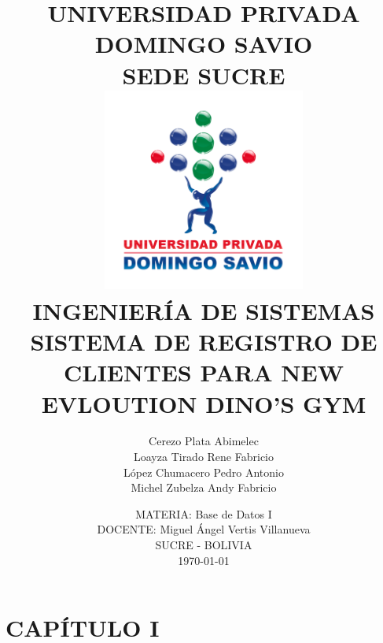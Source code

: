 \documentclass[12pt, letterpaper]{article}
\begin{document}
\title{
    \vspace*{-2cm}
    UNIVERSIDAD PRIVADA DOMINGO SAVIO\\
    SEDE SUCRE\\
    \vspace{0.5cm}
    \includegraphics[width=0.5\textwidth]{logo_upds.png}\\
    \vspace{0.5cm} 
    INGENIERÍA DE SISTEMAS\\
    \vspace{1cm}
    SISTEMA DE REGISTRO DE CLIENTES PARA \textbf{NEW EVLOUTION DINO'S GYM}
}
\author{
    Cerezo Plata Abimelec \\
    Loayza Tirado Rene Fabricio \\
    López Chumacero Pedro Antonio \\
    Michel Zubelza Andy Fabricio
}
\date{
    MATERIA: Base de Datos I \\
    DOCENTE: Miguel Ángel Vertis Villanueva \\
    \vspace{1cm}
    SUCRE - BOLIVIA \\
    \today
}

\maketitle
\thispagestyle{empty}
\newpage
\clearpage

\tableofcontents
\thispagestyle{empty}
\newpage
\clearpage


\listoffigures
\thispagestyle{empty}
\newpage
\clearpage

\setcounter{page}{1}
\section*{CAPÍTULO I}
\setcounter{section}{1}
\end{document}
